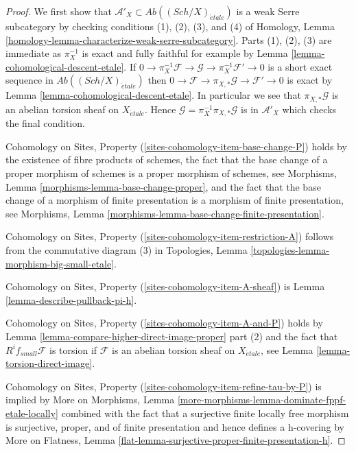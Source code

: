 \documentclass[10pt,a4paper]{amsart}
\theoremstyle{plain}
\theoremstyle{definition}
\theoremstyle{remark}
\numberwithin{equation}{subsection}
\def\Sch{\mathit{Sch}}
\def\etale{{\acute{e}tale}}
\begin{document}
\begin{proof}
We first show that $\mathcal{A}'_X \subset \textit{Ab}((\Sch/X)_\etale)$
is a weak Serre subcategory by checking conditions (1), (2), (3), and (4)
of Homology, Lemma \ref{homology-lemma-characterize-weak-serre-subcategory}.
Parts (1), (2), (3) are immediate as $\pi_X^{-1}$ is exact and
fully faithful for example by Lemma \ref{lemma-cohomological-descent-etale}. If
$0 \to \pi_X^{-1}\mathcal{F} \to \mathcal{G} \to \pi_X^{-1}\mathcal{F}' \to 0$
is a short exact sequence in $\textit{Ab}((\Sch/X)_\etale)$
then $0 \to \mathcal{F} \to \pi_{X, *}\mathcal{G} \to \mathcal{F}' \to 0$
is exact by Lemma \ref{lemma-cohomological-descent-etale}.
In particular we see that $\pi_{X, *}\mathcal{G}$ is an abelian
torsion sheaf on $X_\etale$.
Hence $\mathcal{G} = \pi_X^{-1}\pi_{X, *}\mathcal{G}$ is in
$\mathcal{A}'_X$ which checks the final condition.

\medskip\noindent
Cohomology on Sites, Property (\ref{sites-cohomology-item-base-change-P}) holds
by the existence of fibre products of schemes,
the fact that the base change of a proper morphism of
schemes is a proper morphism of schemes, see
Morphisms, Lemma \ref{morphisms-lemma-base-change-proper}, and
the fact that the base change of a morphism of finite presentation
is a morphism of finite presentation, see
Morphisms, Lemma \ref{morphisms-lemma-base-change-finite-presentation}.

\medskip\noindent
Cohomology on Sites, Property (\ref{sites-cohomology-item-restriction-A})
follows from the commutative diagram (3) in
Topologies, Lemma \ref{topologies-lemma-morphism-big-small-etale}.

\medskip\noindent
Cohomology on Sites, Property (\ref{sites-cohomology-item-A-sheaf}) is
Lemma \ref{lemma-describe-pullback-pi-h}.

\medskip\noindent
Cohomology on Sites, Property (\ref{sites-cohomology-item-A-and-P}) holds by
Lemma \ref{lemma-compare-higher-direct-image-proper} part (2)
and the fact that $R^if_{small}\mathcal{F}$
is torsion if $\mathcal{F}$ is an abelian torsion
sheaf on $X_\etale$, see Lemma \ref{lemma-torsion-direct-image}.

\medskip\noindent
Cohomology on Sites, Property (\ref{sites-cohomology-item-refine-tau-by-P})
is implied by More on Morphisms, Lemma
\ref{more-morphisms-lemma-dominate-fppf-etale-locally}
combined with the fact that a surjective finite locally free morphism
is surjective, proper, and of finite presentation and hence
defines a h-covering by More on Flatness, Lemma
\ref{flat-lemma-surjective-proper-finite-presentation-h}.
\end{proof}
\end{document}
